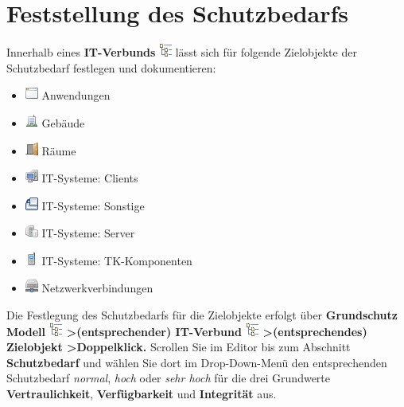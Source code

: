 \documentclass[a4paper,10pt]{book}
\begin{document}
\section{Feststellung des Schutzbedarfs}
Innerhalb eines \textbf{IT-Verbunds} \includegraphics[height=2ex]{Icon/GS_Modell.png} lässt sich für folgende Zielobjekte der Schutzbedarf festlegen und  dokumentieren:
\begin{itemize}
 \item \includegraphics[height=2ex]{Icon/Anwendung.png} Anwendungen
 \item \includegraphics[height=2ex]{Icon/Gebaeude.png} Gebäude
 \item \includegraphics[height=2ex]{Icon/Raeume.png} Räume
 \item \includegraphics[height=2ex]{Icon/Clients.png} IT-Systeme: Clients
 \item \includegraphics[height=2ex]{Icon/Sonstige.png} IT-Systeme: Sonstige
 \item \includegraphics[height=2ex]{Icon/Server.png} IT-Systeme: Server
 \item \includegraphics[height=2ex]{Icon/Tk_komponenten.png} IT-Systeme: TK-Komponenten
 \item \includegraphics[height=2ex]{Icon/Netzwerkverbindungen.png} Netzwerkverbindungen
\end{itemize}
Die Festlegung des Schutzbedarfs für die Zielobjekte erfolgt über \textbf{Grundschutz Modell \includegraphics[height=2ex]{Icon/GS_Modell.png} \textgreater (entsprechender) IT-Verbund \includegraphics[height=2ex]{Icon/GS_Modell.png} \textgreater (entsprechendes) Zielobjekt \textgreater Doppelklick.} Scrollen Sie im Editor bis zum Abschnitt \textbf{Schutzbedarf} und wählen Sie dort im Drop-Down-Menü den entsprechenden Schutzbedarf \textit{normal}, \textit{hoch} oder \textit{sehr hoch} für die drei Grundwerte \textbf{Vertraulichkeit}, \textbf{Verfügbarkeit} und \textbf{Integrität} aus.
\end{document}
